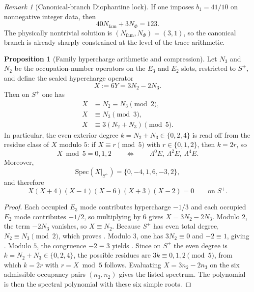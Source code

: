 \documentclass[11pt,a4paper]{article}
\theoremstyle{definition}
\newtheorem{proposition}[theorem]{Proposition}
\theoremstyle{remark}
\newtheorem*{remark}{Remark}
\newcommand{\bone}{b_1}
\begin{document}
\begin{remark}[Canonical-branch Diophantine lock]
If one imposes $\bone=41/10$ on nonnegative integer data, then
\[
40N_{\mathrm{fam}}+3N_\Phi=123.
\]
The physically nontrivial solution is $(N_{\mathrm{fam}},N_\Phi)=(3,1)$, so the canonical branch is already sharply constrained at the level of the trace arithmetic.
\end{remark}

\begin{proposition}[Family hypercharge arithmetic and compression]
\label{prop:family-hypercharge-compression}
Let $N_3$ and $N_2$ be the occupation-number operators on the $E_3$ and $E_2$ slots, restricted to $S^+$, and define the scaled hypercharge operator
\[
X:=6Y=3N_2-2N_3.
\]
Then on $S^+$ one has
\begin{align}
X&\equiv N_2\equiv N_3 \pmod 2,\label{eq:x-mod-2}\\
X&\equiv N_3 \pmod 3,\label{eq:x-mod-3}\\
X&\equiv 3(N_2+N_3) \pmod 5.\label{eq:x-mod-5}
\end{align}
In particular, the even exterior degree $k=N_2+N_3\in\{0,2,4\}$ is read off from the residue class of $X$ modulo $5$: if $X\equiv r\pmod 5$ with $r\in\{0,1,2\}$, then $k=2r$, so
\[
X\bmod 5=0,1,2
\qquad\Longleftrightarrow\qquad
\Lambda^0E,\ \Lambda^2E,\ \Lambda^4E.
\]
Moreover,
\[
\mathrm{Spec}(X|_{S^+})=\{0,-4,1,6,-3,2\},
\]
and therefore
\begin{equation}
\label{eq:family-x-polynomial}
X(X+4)(X-1)(X-6)(X+3)(X-2)=0
\qquad\text{on }S^+.
\end{equation}
\end{proposition}

\begin{proof}
Each occupied $E_3$ mode contributes hypercharge $-1/3$ and each occupied $E_2$ mode contributes $+1/2$, so multiplying by $6$ gives $X=3N_2-2N_3$. Modulo $2$, the term $-2N_3$ vanishes, so $X\equiv N_2$. Because $S^+$ has even total degree, $N_2\equiv N_3\pmod 2$, which proves . Modulo $3$, one has $3N_2\equiv 0$ and $-2\equiv 1$, giving . Modulo $5$, the congruence $-2\equiv 3$ yields . Since on $S^+$ the even degree is $k=N_2+N_3\in\{0,2,4\}$, the possible residues are $3k\equiv 0,1,2\pmod 5$, from which $k=2r$ with $r=X\bmod 5$ follows. Evaluating $X=3n_2-2n_3$ on the six admissible occupancy pairs $(n_3,n_2)$ gives the listed spectrum. The polynomial  is then the spectral polynomial with these six simple roots.
\end{proof}
\end{document}
